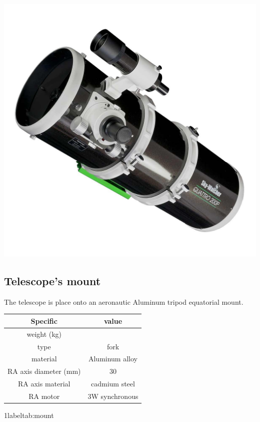 \documentclass{article}
\begin{document}
\begin{multicols}{2}
\begin{minipage}{0.5\textwidth}
            \includegraphics[scale=0.2]{images/newton-quattro-200-sky-watcher.jpg}
            \label{fig:skywatcher_telescope_mount}
        \end{minipage}

        \subsection{Telescope's mount}
        The telescope is place onto an aeronautic Aluminum tripod equatorial mount.
        \\
        \begin{minipage}{.5\textwidth}
            \centering
            \begin{tabular}{cc}
                Specific & value \\
                \hline
                weight (kg) & \\
                type & fork \\
                material & Aluminum alloy \\
                RA axis diameter (mm) & 30 \\
                RA axis material & cadmium steel \\
                RA motor & 3W synchronous \\
                \hline
            \end{tabular}
            1label{tab:mount}
        \end{minipage}


\end{multicols}
\end{document}
